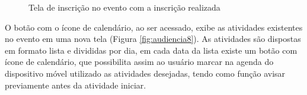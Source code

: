 \begin{figure}[H]
    \centering
    \caption{Tela de inscrição no evento com a inscrição realizada}
    \label{fig:audiencia7}
\end{figure}
   
O botão com o ícone de calendário, ao ser acessado, exibe as atividades existentes no evento em uma nova tela (Figura \ref{fig:audiencia8}). As atividades são dispostas em formato lista e divididas por dia, em cada data da lista existe um botão com ícone de calendário, que possibilita assim ao usuário marcar na agenda do dispositivo móvel utilizado as atividades desejadas, tendo como função avisar previamente antes da atividade iniciar.

